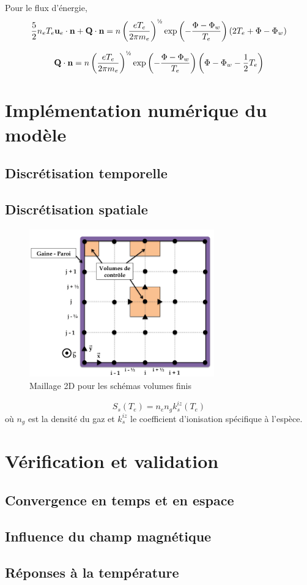 Pour le flux d'énergie, 
\begin{equation}
	\frac{5}{2}n_eT_e\mathbf{u}_e\cdot\mathbf{n}+\mathbf{Q}\cdot\mathbf{n}=
	n\left(\frac{eT_e}{2\pi m_e}\right)^{\text{\textonehalf}}\exp\left({-\frac{\Phi-\Phi_w}{T_e}}\right)\left(2T_e+\Phi-\Phi_w\right)
\end{equation}

\begin{equation}
	\mathbf{Q}\cdot\mathbf{n}=n\left(\frac{eT_e}{2\pi m_e}\right)^{\text{\textonehalf}}\exp\left({-\frac{\Phi-\Phi_w}{T_e}}\right)\left(\Phi-\Phi_w-\frac{1}{2}T_e\right)
\end{equation}


\section{Implémentation numérique du modèle}
\subsection{Discrétisation temporelle}
\subsection{Discrétisation spatiale}
\begin{figure}[htbp]
	\centering
	\includegraphics[height=64mm,width=80mm]{figures/grid.png}
	{\caption{Maillage 2D pour les schémas volumes finis}
	\label{maillage}}
\end{figure}
\begin{equation}
	S_s(T_e)=n_en_gk_{s}^{iz}(T_e)
\end{equation}
où $n_g$ est la densité du gaz et $k_{s}^{iz}$ le coefficient d'ionisation spécifique à l'espèce. 


\section{Vérification et validation}
\subsection{Convergence en temps et en espace}
\subsection{Influence du champ magnétique}
\subsection{Réponses à la température}


